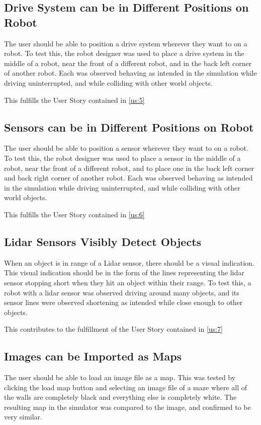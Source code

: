\subsection{Drive System can be in Different Positions on Robot}
The user should be able to position a drive system wherever they want to on a robot. To test this, the robot designer was used to place a drive system in the middle of a robot, near the front of a different robot, and in the back left corner of another robot. Each was observed behaving as intended in the simulation while driving uninterrupted, and while colliding with other world objects.

This fulfills the User Story contained in \ref{us:5}

\subsection{Sensors can be in Different Positions on Robot}
The user should be able to position a sensor wherever they want to on a robot. To test this, the robot designer was used to place a sensor in the middle of a robot, near the front of a different robot, and to place one in the back left corner and back right corner of another robot. Each was observed behaving as intended in the simulation while driving uninterrupted, and while colliding with other world objects.

This fulfills the User Story contained in \ref{us:6}

\subsection{Lidar Sensors Visibly Detect Objects}
When an object is in range of a Lidar sensor, there should be a visual indication. This visual indication should be in the form of the lines representing the lidar sensor stopping short when they hit an object within their range. To test this, a robot with a lidar sensor was observed driving around many objects, and its sensor lines were observed shortening as intended while close enough to other objects.

This contributes to the fulfillment of the User Story contained in \ref{us:7}

\subsection{Images can be Imported as Maps}
The user should be able to load an image file as a map. This was tested by clicking the load map button and selecting an image file of a maze where all of the walls are completely black and everything else is completely white. The resulting map in the simulator was compared to the image, and confirmed to be very similar.

